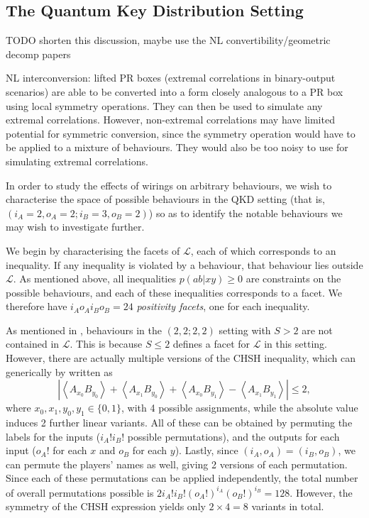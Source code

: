 \documentclass[10pt, a4paper]{article}
\numberwithin{equation}{section} %
\theoremstyle{definition}
\theoremstyle{plain}
\newcommand{\abs}[1]{\left\lvert#1\right\rvert}
\newcommand{\?}{\mathrel{?}} %
\newcommand{\angleb}[1]{\left\langle #1 \right\rangle} %
\newcommand{\Ls}{\mathcal{L}}
\begin{document}
      \subsection{The Quantum Key Distribution Setting}\label{sec:nl_qkdsett}

      TODO shorten this discussion, maybe use the NL convertibility/geometric decomp papers

      NL interconversion: lifted PR boxes (extremal correlations in binary-output scenarios) are able to be converted into a form closely analogous to a PR box using local symmetry operations. They can then be used to simulate any extremal correlations. However, non-extremal correlations may have limited potential for symmetric conversion, since the symmetry operation would have to be applied to a mixture of behaviours. They would also be too noisy to use for simulating extremal correlations.

      In order to study the effects of wirings on arbitrary behaviours, we wish to characterise the space of possible behaviours in the QKD setting (that is, \((i_A=2,o_A=2;i_B=3,o_B=2)\)) so as to identify the notable behaviours we may wish to investigate further.

      We begin by characterising the facets of \(\Ls\), each of which corresponds to an inequality. If any inequality is violated by a behaviour, that behaviour lies outside \(\Ls\). As mentioned above, all inequalities \(p(ab|xy) \geq 0\) are constraints on the possible behaviours, and each of these inequalities corresponds to a facet. We therefore have \(i_A o_A i_B o_B = 24\) \emph{positivity facets}, one for each inequality.

      As mentioned in , behaviours in the \((2,2;2,2)\) setting with \(S > 2\) are not contained in \(\Ls\). This is because \(S \leq 2\) defines a facet for \(\Ls\) in this setting. However, there are actually multiple versions of the CHSH inequality, which can generically by written as
      \[ \abs{\angleb{A_{x_0} B_{y_0}} + \angleb{A_{x_1} B_{y_0}} + \angleb{A_{x_0} B_{y_1}} - \angleb{A_{x_1} B_{y_1}}} \leq 2, \]
      where \(x_0, x_1, y_0, y_1 \in \{0,1\}\), with 4 possible assignments, while the absolute value induces 2 further linear variants. All of these can be obtained by permuting the labels for the inputs (\(i_A!i_B!\) possible permutations), and the outputs for each input (\(o_A!\) for each \(x\) and \(o_B\) for each \(y\)). Lastly, since \((i_A, o_A) = (i_B, o_B)\), we can permute the players' names as well, giving 2 versions of each permutation. Since each of these permutations can be applied independently, the total number of overall permutations possible is \(2i_A!i_B!(o_A!)^{i_A}(o_B!)^{i_B} = 128\). However, the symmetry of the CHSH expression yields only \(2 \times 4 = 8\) variants in total.
\end{document}
